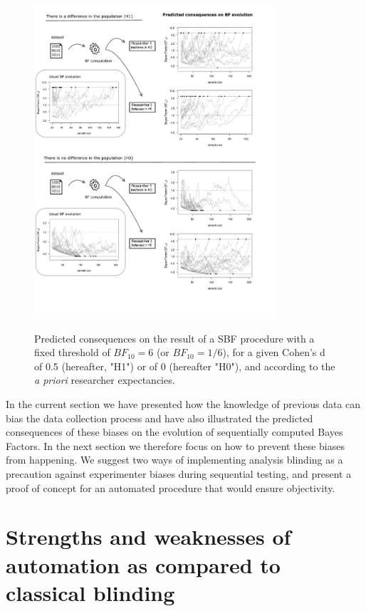 \documentclass[a4paper,man,natbib,floatsintext,donotrepeattitle]{apa6}
\begin{document}
\begin{figure}[H]
  \caption{Predicted consequences on the result of a SBF procedure with a fixed threshold of $BF_{10} = 6$ (or $BF_{10} = 1/6$), for a given Cohen's d of 0.5 (hereafter, "H1") or of 0 (hereafter "H0"), and according to the \emph{a priori} researcher expectancies.}
  \centering
  \includegraphics[width=0.8\textwidth]{figures/BFF_predictions.pdf}
  \label{fig:pred}
\end{figure}

In the current section we have presented how the knowledge of previous data can bias the data collection process and have also illustrated the predicted consequences of these biases on the evolution of sequentially computed Bayes Factors. In the next section we therefore focus on how to prevent these biases from happening. We suggest two ways of implementing analysis blinding as a precaution against experimenter biases during sequential testing, and present a proof of concept for an automated procedure that would ensure objectivity.

\section{Strengths and weaknesses of automation as compared to classical blinding}
\end{document}
